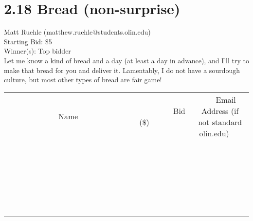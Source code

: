 \documentclass[11pt]{article}
\begin{document}
\section*{2.18 Bread (non-surprise) }
Matt Ruehle  (matthew.ruehle@students.olin.edu) \\
Starting Bid: \$5 \\
Winner(s): 
Top bidder \\
Let me know a kind of bread and a day (at least a day in advance), and I'll try to make that bread for you and deliver it. Lamentably, I do not have a sourdough culture, but most other types of bread are fair game! \\[6ex]
\begin{tabular}{c c c}
~~~~~~~~~~~~~Name~~~~~~~~~~~~~ & ~~~~~~~~~Bid (\$)~~~~~~~~~ & ~~~Email Address (if not standard olin.edu)~~~ \\
 & & \\
\hline
 & & \\
\hline
 & & \\
\hline
 & & \\
\hline
 & & \\
\hline
 & & \\
\hline
 & & \\
\hline
 & & \\
\hline
 & & \\
\hline
 & & \\
\hline
 & & \\
\hline
 & & \\
\hline
 & & \\
\hline
 & & \\
\hline
 & & \\
\hline
 & & \\
\hline
 & & \\
\hline
 & & \\
\hline
 & & \\
\hline
 & & \\
\hline
 & & \\
\hline
 & & \\
\hline
 & & \\
\hline
 & & \\
\hline
 & & \\
\hline
 & & \\
\hline
\end{tabular}
\clearpage
\end{document}

